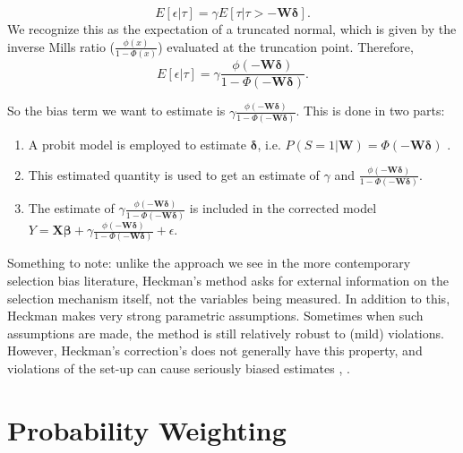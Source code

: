 \documentclass[12pt,twoside]{reedthesis}
\theoremstyle{definition}
\begin{document}
$$E[\epsilon | \tau] = \gamma E[\tau | \tau >  - \mathbf{W} \boldsymbol{\delta}].$$																																																												
We recognize this as the expectation of a truncated normal, which is given by the inverse Mills ratio ($\frac{\phi(x)}{1 - \Phi(x)}$) evaluated at the truncation point. Therefore, 								$$E[\epsilon | \tau] = \gamma \frac{\phi(- \mathbf{W} \boldsymbol{\delta})}{1  - \Phi(- \mathbf{W} \boldsymbol{\delta})}.$$				

So the bias term  we want to estimate is $\gamma \frac{\phi(- \mathbf{W} \boldsymbol{\delta})}{1  - \Phi(- \mathbf{W} \boldsymbol{\delta})}$. This is done in two parts:

\begin{enumerate}
\item A probit model is employed to estimate $\boldsymbol{\delta}$, i.e. $P(S = 1 | \mathbf{W}) = \Phi(- \mathbf{W} \boldsymbol{\delta})$ \cite{Jin}.

\item This estimated quantity is used to get an estimate of $\gamma$ and $\frac{\phi(- \mathbf{W} \boldsymbol{\delta})}{1  - \Phi(- \mathbf{W} \boldsymbol{\delta})}$.

\item The estimate of $\gamma \frac{\phi(- \mathbf{W} \boldsymbol{\delta})}{1  - \Phi(- \mathbf{W} \boldsymbol{\delta})}$ is included in the corrected model $Y = \mathbf{X} \boldsymbol{\beta} + \gamma \frac{\phi(- \mathbf{W} \boldsymbol{\delta})}{1  - \Phi(- \mathbf{W} \boldsymbol{\delta})} + \epsilon$.
\end{enumerate}
						
Something to note: unlike the approach we see in the more contemporary selection bias literature, Heckman's method asks for external information on the selection mechanism itself, not the variables being measured. In addition to this, Heckman makes very strong parametric assumptions. Sometimes when such assumptions are made, the method is still relatively robust to (mild) violations.  However, Heckman's correction's does not generally have this property, and violations of the set-up can cause seriously biased estimates \citep{Little_1986}, \citep{Bushway_2007}. 

\section{Probability Weighting}
\end{document}
